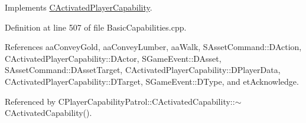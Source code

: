 Implements \hyperlink{classCActivatedPlayerCapability_a943b5999a57504399293250382c0ec6a}{C\+Activated\+Player\+Capability}.



Definition at line 507 of file Basic\+Capabilities.\+cpp.



References aa\+Convey\+Gold, aa\+Convey\+Lumber, aa\+Walk, S\+Asset\+Command\+::\+D\+Action, C\+Activated\+Player\+Capability\+::\+D\+Actor, S\+Game\+Event\+::\+D\+Asset, S\+Asset\+Command\+::\+D\+Asset\+Target, C\+Activated\+Player\+Capability\+::\+D\+Player\+Data, C\+Activated\+Player\+Capability\+::\+D\+Target, S\+Game\+Event\+::\+D\+Type, and et\+Acknowledge.



Referenced by C\+Player\+Capability\+Patrol\+::\+C\+Activated\+Capability\+::$\sim$\+C\+Activated\+Capability().


